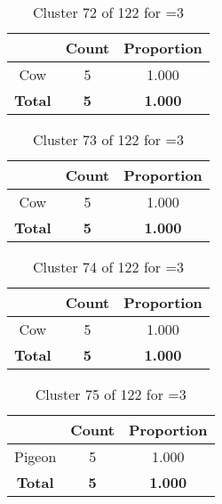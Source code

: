 \begin{table}[ht!]
\centering
\begin{tabular}{|c|c|c|}
\hline
\bf \Spec{} &\bf Count &\bf Proportion\\ \hline \hline
Cow & 5 & 1.000\\ \hline
\hline
\bf Total & \bf 5 & \bf 1.000\\ \hline
\end{tabular}
\label{tab:cluster:72:3}
\caption{Cluster 72 of 122 for \minneigh{}=3}
\end{table}

\begin{table}[ht!]
\centering
\begin{tabular}{|c|c|c|}
\hline
\bf \Spec{} &\bf Count &\bf Proportion\\ \hline \hline
Cow & 5 & 1.000\\ \hline
\hline
\bf Total & \bf 5 & \bf 1.000\\ \hline
\end{tabular}
\label{tab:cluster:73:3}
\caption{Cluster 73 of 122 for \minneigh{}=3}
\end{table}

\begin{table}[ht!]
\centering
\begin{tabular}{|c|c|c|}
\hline
\bf \Spec{} &\bf Count &\bf Proportion\\ \hline \hline
Cow & 5 & 1.000\\ \hline
\hline
\bf Total & \bf 5 & \bf 1.000\\ \hline
\end{tabular}
\label{tab:cluster:74:3}
\caption{Cluster 74 of 122 for \minneigh{}=3}
\end{table}

\begin{table}[ht!]
\centering
\begin{tabular}{|c|c|c|}
\hline
\bf \Spec{} &\bf Count &\bf Proportion\\ \hline \hline
Pigeon & 5 & 1.000\\ \hline
\hline
\bf Total & \bf 5 & \bf 1.000\\ \hline
\end{tabular}
\label{tab:cluster:75:3}
\caption{Cluster 75 of 122 for \minneigh{}=3}
\end{table}

